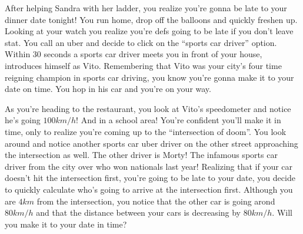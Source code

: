 \documentclass{ximera}
\begin{document}
\begin{exercise}\label{exercise:8-7}
After helping Sandra with her ladder, you realize you're gonna be late to your dinner date tonight! You run home, drop off the balloons and quickly freshen up. Looking at your watch you realize you're defs going to be late if you don't leave stat. You call an uber and decide to click on the ``sports car driver'' option. Within 30 seconds a sports car driver meets you in front of your house, introduces himself as Vito. Remembering that Vito was your city's four time reigning champion in sports car driving, you know you're gonna make it to your date on time. You hop in his car and you're on your way.

As you're heading to the restaurant, you look at Vito's speedometer and notice he's going $100 km / h$! And in a school area! You're confident you'll make it in time, only to realize you're coming up to the ``intersection of doom''. You look around and notice another sports car uber driver on the other street approaching the intersection as well. The other driver is Morty! The infamous sports car driver from the city over who won nationals last year! Realizing that if your car doesn't hit the intersection first, you're going to be late to your date, you decide to quickly calculate who's going to arrive at the intersection first. Although you are $4 km$ from the intersection, you notice that the other car is going arond $80 km / h$ and that the distance between your cars is decreasing by $80 km / h$. Will you make it to your date in time?
\begin{freeResponse}\end{freeResponse}
\end{exercise}
\end{document}
